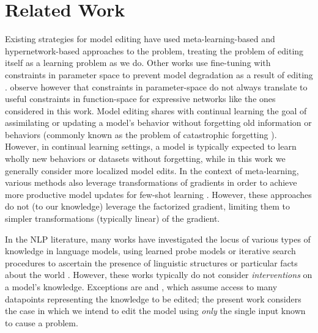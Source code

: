 \documentclass{article}
\begin{document}
\section{Related Work}
Existing strategies for model editing have used meta-learning-based \citep{finn2017maml,Sinitsin2020Editable} and hypernetwork-based \citep{ha2017hyper,Cao2021EditingFK} approaches to the problem, treating the problem of editing itself as a learning problem as we do. Other works use fine-tuning with constraints in parameter space to prevent model degradation as a result of editing \citep{zhu2020modifying,Sotoudeh2021ProvableRO}. \cite{Cao2021EditingFK} observe however that constraints in parameter-space do not always translate to useful constraints in function-space for expressive networks like the ones considered in this work. Model editing shares with continual learning \citep{mccloskey1989catastrophic,parisi2018continual} the goal of assimilating or updating a model's behavior without forgetting old information or behaviors (commonly known as the problem of catastrophic forgetting \citep{mccloskey1989catastrophic,ratcliff1990connectionist,kirkpatrick2017overcoming}). However, in continual learning settings, a model is typically expected to learn wholly new behaviors or datasets \citep{kirkpatrick2017overcoming,parisi2018continual} without forgetting, while in this work we generally consider more localized model edits. In the context of meta-learning, various methods also leverage transformations of gradients in order to achieve more productive model updates for few-shot learning \citep{li2017metasgd,lee2018gradient,park2019meta,Flennerhag2020Meta-Learning}. However, these approaches do not (to our knowledge) leverage the factorized gradient, limiting them to simpler transformations (typically linear) of the gradient. %

In the NLP literature, many works have investigated the locus of various types of knowledge in language models, using learned probe models or iterative search procedures to ascertain the presence of linguistic structures \citep{belinkov-etal-2017-neural,conneau-etal-2018-cram,hewitt-manning-2019-structural} or particular facts about the world \cite{petroni-etal-2019-language,Jiang2020HowCW,dai2021knowledge}. However, these works typically do not consider \textit{interventions} on a model's knowledge. Exceptions are \cite{dai2021knowledge} and \cite{wang2020kadapter}, which assume access to many datapoints representing the knowledge to be edited; the present work considers the case in which we intend to edit the model using \textit{only} the single input known to cause a problem.
\end{document}
